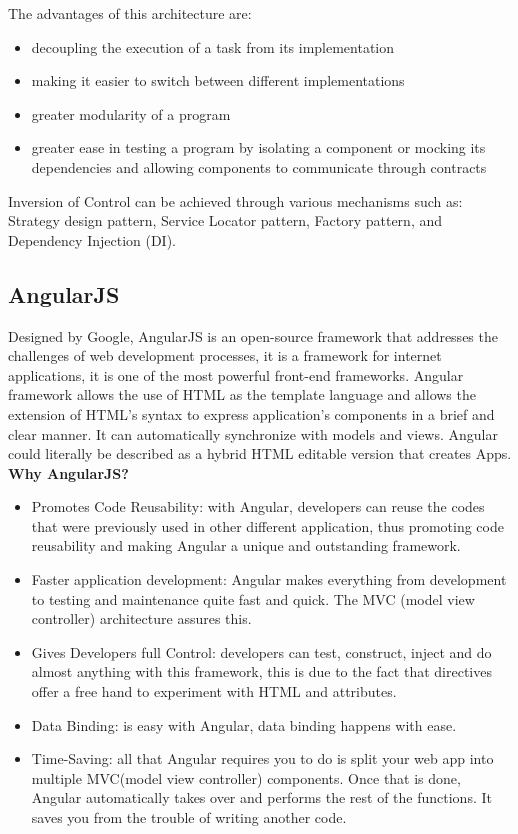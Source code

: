 The advantages of this architecture are:
\begin{itemize}
\item decoupling the execution of a task from its implementation
\item making it easier to switch between different implementations
\item greater modularity of a program
\item greater ease in testing a program by isolating a component or mocking its dependencies and allowing components to communicate through contracts
\end{itemize}

Inversion of Control can be achieved through various mechanisms such as: Strategy design pattern, Service Locator pattern, Factory pattern, and Dependency Injection (DI).

\subsection{AngularJS}

Designed by Google, AngularJS is an open-source framework that addresses the challenges of web development processes, it is a framework for internet applications, it is one of the most powerful front-end frameworks. 
Angular framework allows the use of HTML as the template language and allows the extension of HTML’s syntax to express application’s components in a brief and clear manner. It can automatically synchronize with models and views. Angular could literally be described as a hybrid HTML editable version that creates Apps.\\

\textbf{Why AngularJS?}
\begin{itemize}
\item Promotes Code Reusability: with Angular, developers can reuse the codes that were previously used in other different application, thus promoting code reusability and making Angular a unique and outstanding framework.
\item Faster application development: Angular makes everything from development to testing and maintenance quite fast and quick. The MVC (model view controller) architecture assures this.
\item Gives Developers full Control: developers can test, construct, inject and do almost anything with this framework, this is due to the fact that directives offer a free hand to experiment with HTML and attributes.
\item Data Binding: is easy with Angular, data binding happens with ease.
\item Time-Saving: all that Angular requires you to do is split your web app into multiple MVC(model view controller) components. Once that is done, Angular automatically takes over and performs the rest of the functions. It saves you from the trouble of writing another code.
\end{itemize}

